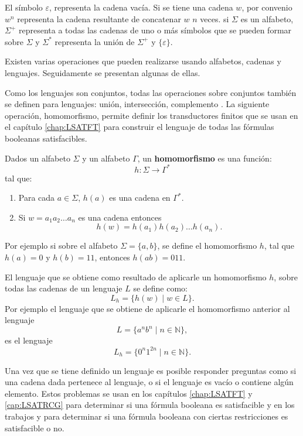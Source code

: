 El símbolo $\varepsilon$, representa la cadena vacía. Si se tiene una cadena $w$, por convenio  $w^n$ representa la cadena
resultante de concatenar $w$ $n$ veces. si $\Sigma$ es un alfabeto, $\Sigma^{+}$ representa a todas las cadenas de uno o más 
símbolos que se pueden formar sobre $\Sigma$ y  $\Sigma^*$  representa la unión de $\Sigma^{+}$ y $\{\varepsilon\}$.

Existen varias operaciones que pueden realizarse usando alfabetos, cadenas y lenguajes. Seguidamente se presentan algunas de ellas.

Como los lenguajes son conjuntos, todas las operaciones sobre conjuntos también se definen para lenguajes: unión, intersección, complemento \cite{authomataTheory}.
La siguiente operación, homomorfismo, permite definir los transductores finitos que se usan en el capítulo \ref{chap:LSATFT} para 
construir el lenguaje de todas las fórmulas booleanas satisfacibles.

\begin{definition}
  Dados un alfabeto \( \Sigma \) y un alfabeto \( \Gamma \), un \textbf{homomorfismo} es una función:
  \[
    h: \Sigma \to \Gamma^*
  \]
  tal que:
  \begin{enumerate}
    \item Para cada \( a \in \Sigma \), \( h(a) \) es una cadena en \( \Gamma^* \).
    \item Si $w=a_1a_2\ldots a_n$ es una cadena entonces
          $$h(w)=h(a_1)h(a_2)\ldots h(a_n).$$
  \end{enumerate}
\end{definition}

Por ejemplo si sobre el alfabeto $\Sigma=\{a,b\}$, se define el homomorfismo $h$, tal que $h(a)=0$ y $h(b)=11$, entonces
$h(ab)=011$.

El lenguaje que se obtiene como resultado de aplicarle un homomorfismo $h$, sobre todas las cadenas de un lenguaje $L$ se define como:
$$L_h=\{h(w)\mid w\in L\}.$$
Por ejemplo el lenguaje que se obtiene de aplicarle el homomorfismo anterior al lenguaje $$L=\{a^nb^n\mid n\in \mathbb{N}\},$$ es el lenguaje
$$L_h=\{0^n1^{2n}\mid n\in \mathbb{N}\}.$$

Una vez que se tiene definido un lenguaje es posible responder preguntas como si una cadena dada pertenece al lenguaje, o si el lenguaje es vacío o contiene algún elemento.
Estos problemas se usan en los capítulos \ref{chap:LSATFT} y \ref{cap:LSATRCG} para determinar si una fórmula booleana
es satisfacible y en los trabajos \cite{aCFSAT} y \cite{aSRCSAT} para determinar si una fórmula booleana con ciertas restricciones es 
satisfacible o no.

